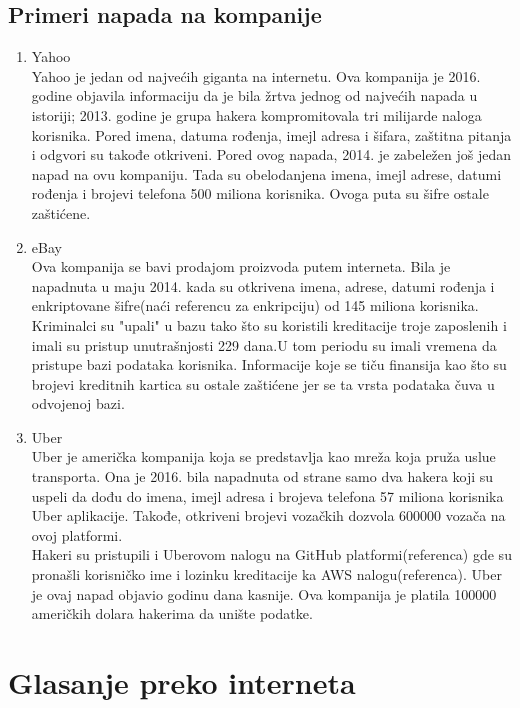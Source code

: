 \documentclass[a4paper]{article}
\begin{document}
\subsection{Primeri napada na kompanije}
\label{subsec:primeri_napada_kompanije}


\begin{enumerate}
\item Yahoo
\\Yahoo je jedan od najvećih giganta na internetu. Ova kompanija je 2016. godine objavila informaciju da je bila žrtva jednog od najvećih napada u istoriji; 2013. godine je grupa hakera kompromitovala tri milijarde naloga korisnika. Pored imena, datuma rođenja, imejl adresa i šifara, zaštitna pitanja i odgvori su takođe otkriveni. 
Pored ovog napada, 2014. je zabeležen još jedan napad na ovu kompaniju. Tada su obelodanjena imena, imejl adrese, datumi rođenja i brojevi telefona 500 miliona korisnika. Ovoga puta su šifre ostale zaštićene.\\ 
\item eBay
\\Ova kompanija se bavi prodajom proizvoda putem interneta. Bila je napadnuta u maju 2014. kada su otkrivena imena, adrese, datumi rođenja i enkriptovane šifre(naći referencu za enkripciju) od 145 miliona korisnika. Kriminalci su "upali" u bazu tako što su koristili kreditacije troje zaposlenih i imali su pristup unutrašnjosti 229 dana.U tom periodu su imali vremena da pristupe bazi podataka korisnika. Informacije koje se tiču finansija kao što su brojevi kreditnih kartica su ostale zaštićene jer se ta vrsta podataka čuva u odvojenoj bazi.\\
\item Uber
\\Uber je američka kompanija koja se predstavlja kao mreža koja pruža uslue transporta. Ona je 2016. bila napadnuta od strane samo dva hakera koji su uspeli da dođu do imena, imejl adresa i brojeva telefona 57 miliona korisnika Uber aplikacije. Takođe, otkriveni brojevi vozačkih dozvola 600000 vozača na ovoj platformi.\\Hakeri su pristupili i Uberovom nalogu na GitHub platformi(referenca) gde su pronašli korisničko ime i lozinku kreditacije ka AWS nalogu(referenca). 
Uber je ovaj napad objavio godinu dana kasnije. Ova kompanija je platila 100000 američkih dolara hakerima da unište podatke.  
\end{enumerate}


\section{Glasanje preko interneta}
\label{sec:glasanje}
\end{document}
